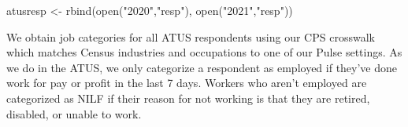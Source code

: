 \documentclass[
]{article}
\newenvironment{Shaded}{\begin{snugshade}}{\end{snugshade}}
\newcommand{\AttributeTok}[1]{\textcolor[rgb]{0.77,0.63,0.00}{#1}}
\newcommand{\ConstantTok}[1]{\textcolor[rgb]{0.00,0.00,0.00}{#1}}
\newcommand{\ControlFlowTok}[1]{\textcolor[rgb]{0.13,0.29,0.53}{\textbf{#1}}}
\newcommand{\FunctionTok}[1]{\textcolor[rgb]{0.00,0.00,0.00}{#1}}
\newcommand{\NormalTok}[1]{#1}
\newcommand{\OtherTok}[1]{\textcolor[rgb]{0.56,0.35,0.01}{#1}}
\newcommand{\SpecialCharTok}[1]{\textcolor[rgb]{0.00,0.00,0.00}{#1}}
\newcommand{\StringTok}[1]{\textcolor[rgb]{0.31,0.60,0.02}{#1}}
\begin{document}
\begin{Shaded}
\end{Shaded}

\begin{Shaded}
\begin{Highlighting}[]
\NormalTok{atusresp }\OtherTok{\textless{}{-}} \FunctionTok{rbind}\NormalTok{(}\FunctionTok{open}\NormalTok{(}\StringTok{"2020"}\NormalTok{,}\StringTok{"resp"}\NormalTok{),}
                  \FunctionTok{open}\NormalTok{(}\StringTok{"2021"}\NormalTok{,}\StringTok{"resp"}\NormalTok{))}
\end{Highlighting}
\end{Shaded}

We obtain job categories for all ATUS respondents using our CPS
crosswalk which matches Census industries and occupations to one of our
Pulse settings. As we do in the ATUS, we only categorize a respondent as
employed if they've done work for pay or profit in the last 7 days.
Workers who aren't employed are categorized as NILF if their reason for
not working is that they are retired, disabled, or unable to work.
\end{document}
